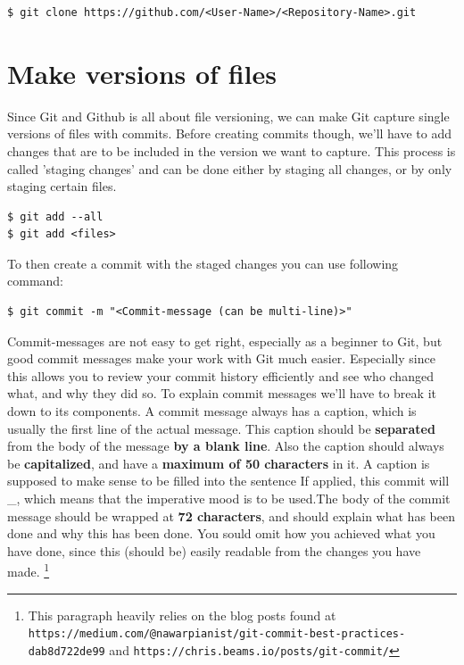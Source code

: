 \documentclass[a4paper, 12pt]{article}
\begin{document}
		\begin{lstlisting}
$ git clone https://github.com/<User-Name>/<Repository-Name>.git
		\end{lstlisting}

	\section{Make versions of files}
	
		Since Git and Github is all about file versioning, we can make Git capture single versions of files with commits. Before creating commits though, we'll have to add changes that are to be included in the version we want to capture. This process is called 'staging changes' and can be done either by staging all changes, or by only staging certain files.
		
		\begin{lstlisting}
$ git add --all
$ git add <files>
		\end{lstlisting}
		
		To then create a commit with the staged changes you can use following command:
		
		\begin{lstlisting}
$ git commit -m "<Commit-message (can be multi-line)>"
		\end{lstlisting}
		
		Commit-messages are not easy to get right, especially as a beginner to Git, but good commit messages make your work with Git much easier. Especially since this allows you to review your commit history efficiently and see who changed what, and why they did so. To explain commit messages we'll have to break it down to its components. A commit message always has a caption, which is usually the first line of the actual message. This caption should be \textbf{separated} from the body of the message \textbf{by a blank line}. Also the caption should always be \textbf{capitalized}, and have a \textbf{maximum of 50 characters} in it. A caption is supposed to make sense to be filled into the sentence \glqq If applied, this commit will \_\grqq, which means that the imperative mood is to be used.The body of the commit message should be wrapped at \textbf{72 characters}, and should explain what has been done and why this has been done. You sould omit how you achieved what you have done, since this (should be) easily readable from the changes you have made. \footnote{This paragraph heavily relies on the blog posts found at \lstinline|https://medium.com/@nawarpianist/git-commit-best-practices-dab8d722de99| and \lstinline|https://chris.beams.io/posts/git-commit/|}
		
\end{document}

